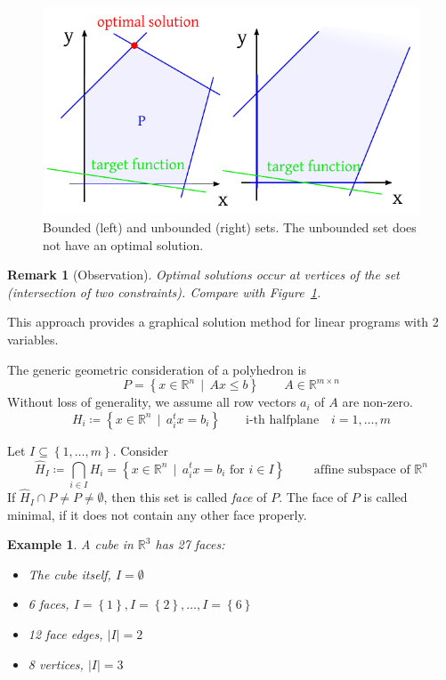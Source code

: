\documentclass{article}
\numberwithin{lecref}{section}
\newtheorem*{Example}{Example}
\newtheorem*{Remark}{Remark}
\newcommand{\Abs}[1]{\left|#1\right|}
\newcommand{\Set}[1]{\left\{#1\right\}}
\newcommand{\SetDef}[2]{\left\{#1\,\mid\,#2\right\}}
\begin{document}
\begin{figure}[t]
	\begin{center}
		\includegraphics{img/01-bounded-set.pdf}
		\caption{Bounded (left) and unbounded (right) sets. The unbounded set does not have an optimal solution.}
		\label{img:boundedness}
	\end{center}
\end{figure}

\begin{Remark}[Observation]
  Optimal solutions occur at vertices of the set (intersection of two constraints). Compare with Figure~\ref{img:boundedness}.
\end{Remark}

This approach provides a graphical solution method for linear programs with 2 variables.

The generic geometric consideration of a polyhedron is
\[ P = \SetDef{x \in \mathbb R^n}{Ax \leq b} \qquad A \in \mathbb R^{m \times n} \]
Without loss of generality, we assume all row vectors $a_i$ of $A$ are non-zero.
\[ H_i \coloneqq \SetDef{x \in \mathbb R^n}{a_i^t x = b_i} \qquad \text{i-th halfplane} \quad i = 1, \dots, m \]

Let $I \subseteq \Set{1, \dots, m}$. Consider
\[ \hat H_I \coloneqq \bigcap_{i \in I} H_i = \SetDef{x \in \mathbb R^n}{a_i^t x = b_i \text{ for } i \in I} \qquad \text{ affine subspace of } \mathbb R^n \]
If $\hat H_I \cap P \neq P \neq \emptyset$, then this set is called \emph{face} of $P$.
The face of $P$ is called minimal, if it does not contain any other face properly.

\begin{Example}
	A cube in $\mathbb R^3$ has 27 faces:
	\begin{itemize}
		\item The cube itself, $I = \emptyset$
		\item 6 faces, $I = \Set{1}, I = \Set{2}, \dots, I = \Set{6}$
		\item 12 face edges, $\Abs{I} = 2$
		\item 8 vertices, $\Abs{I} = 3$
	\end{itemize}
\end{Example}
\end{document}
